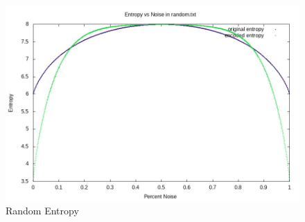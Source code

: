 \documentclass[12pt]{article}
\begin{document}
\begin{figure}[H]
	\caption{Random Entropy}\label{random_entropy}
	\includegraphics[width=6in]{random.txt.entropy.jpg}
	\centering
\end{figure}
\end{document}
